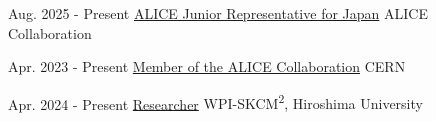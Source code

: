 

\begin{cvskills}

  \cvskill
    {Aug. 2025 - Present} %
    {\href{https://alice-collaboration.web.cern.ch/organization/juniors/index.html}{ALICE Junior Representative for Japan}} %
    {ALICE Collaboration} %

  \cvskill
    {Apr. 2023 - Present} %
    {\href{https://greybook.cern.ch/participant/detail?id=868776}{Member of the ALICE Collaboration}} %
    {CERN} %

  \cvskill
    {Apr. 2024 - Present} %
    {\href{https://wpi-skcm2.hiroshima-u.ac.jp/people/shunsuke-kurita/}{Researcher}} %
    {WPI-SKCM\textsuperscript{2}, Hiroshima University} %

\end{cvskills}

